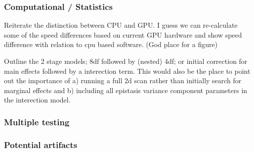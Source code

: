 \documentclass{article}
\begin{document}
\subsubsection{Computational / Statistics}

Reiterate the distinction between CPU and GPU. I guess we can re-calculate some of the speed differences based on current GPU hardware and show speed difference with relation to cpu based software. (God place for a figure)

Outline the 2 stage models; 8df followed by (nested) 4df; or initial correction for main effects followed by a interection term. This would also be the place to point out the importance of a) running a full 2d scan rather than initially search for marginal effects and b) including all epistasis variance component parameters in the interection model. 



\subsubsection{Multiple testing}



\subsubsection{Potential artifacts}
\end{document}
